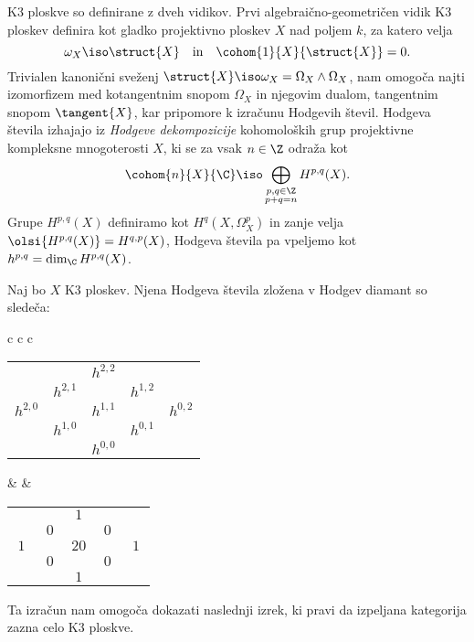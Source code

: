 K3 ploskve so definirane z dveh vidikov. Prvi algebraično-geometričen vidik K3 ploskev definira kot gladko projektivno ploskev $X$ nad poljem $k$, za katero velja 
\[
    \omega_X \iso \struct{X} \quad \text{in} \quad \cohom{1}{X}{\struct{X}} = 0.
\]
Trivialen kanonični sveženj $\struct{X} \iso \omega_X = \Omega_X \wedge \Omega_X$, nam omogoča najti izomorfizem med kotangentnim snopom $\Omega_X$ in njegovim dualom, tangentnim snopom $\tangent{X}$, kar pripomore k izračunu Hodgevih števil. Hodgeva števila izhajajo iz \emph{Hodgeve dekompozicije} kohomoloških grup projektivne kompleksne mnogoterosti $X$, ki se za vsak $n \in \Z$ odraža kot
\[
    \cohom{n}{X}{\C} \iso \bigoplus_{\substack{p,q \in \Z \\ p+q = n}} H^{p,q}(X).
\]
Grupe $H^{p,q}(X)$ definiramo kot $H^q(X, \Omega_X^p)$ in zanje velja $\olsi{H^{p,q}(X)} = H^{q,p}(X)$, Hodgeva števila pa vpeljemo kot $h^{p,q} = \dim_\C H^{p,q}(X)$.
\begin{trditev}
    Naj bo $X$ K3 ploskev. Njena Hodgeva števila zložena v Hodgev diamant so sledeča:
    \begin{center}
        \begin{tabular}{c c c}
            \begin{tabular}{ccccc}
                &  & $h^{2,2}$ &  &  \\
                & $h^{2,1}$ &  & $h^{1,2}$ &  \\
                $h^{2,0}$ &  & $h^{1,1}$ &  & $h^{0,2}$ \\
                & $h^{1,0}$ &  & $h^{0,1}$ &  \\
                &  & $h^{0,0}$ &  &  \\
            \end{tabular} & \qquad &
            \begin{tabular}{ccccc}
                &  & $\ 1 \ $ &  &  \\
                & $\ 0 \ $ &  & $\ 0 \ $ &  \\
                $\ 1 \ $ &  & $20$ &  & $\ 1 \ $ \\
                & $0$ &  & $0$ &  \\
                &  & $1$ &  &  \\
            \end{tabular}
        \end{tabular}
    \end{center}
\end{trditev}

Ta izračun nam omogoča dokazati naslednji izrek, ki pravi da izpeljana kategorija zazna celo K3 ploskve. 

